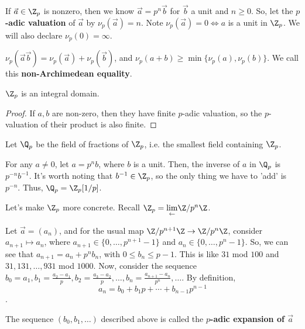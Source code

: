 \begin{defn}
    If $\vec a \in \Z_p$ is nonzero, then we know $\vec a = p^n\vec b$ for $\vec b$ a unit and $n \geq 0$. So, let the \textbf{$p$-adic valuation} of $\vec a$ by $\nu_p(\vec a)=n$. Note $\nu_p(\vec a) = 0 \iff a$ is a unit in $\Z_p$. We will also declare $\nu_p(0) = \infty$.
\end{defn}

\begin{rmk}
    $\nu_p(\vec a \vec b)=\nu_p(\vec a)+\nu _p(\vec b)$, and $\nu_p(a+b) \geq \min \{\nu _p(a),\nu _p(b)\}$. We call this \textbf{non-Archimedean equality}.
\end{rmk}

\begin{cor}
    $\Z_p$ is an integral domain.
\end{cor}

\begin{proof}
    If $a,b$ are non-zero, then they have finite $p$-adic valuation, so the $p$-valuation of their product is also finite.
\end{proof}

\begin{defn}[$\Q_p$]
    Let $\Q_p$ be the field of fractions of $\Z_p$, i.e. the smallest field containing $\Z_p$.
\end{defn}

\begin{rmk}
    For any $a \neq 0$, let $a=p^nb$, where $b$ is a unit. Then, the inverse of $a$ in $\Q_p$ is $p^{-n}b^{-1}$. It's worth noting that $b^{-1} \in \Z_p$, so the only thing we have to 'add' is $p^{-n}$. Thus, $\Q_p = \Z_p[1/p]$.
\end{rmk}

Let's make $\Z_p$ more concrete. Recall $\Z_p = \underset{\leftarrow}{\lim}\Z/p^n\Z$.

Let $\vec a = (a_n)$, and for the usual map $\Z/{p^{n+1}}\Z \to \Z/p^n\Z$, consider $a_{n+1}\mapsto a_n$, where $a_{n+1}\in \{0,\dots,p^{n+1}-1\}$ and $a_n \in \{0,\dots,p^n-1\}$. So, we can see that $a_{n+1}=a_n+p^nb_n$, with $0 \leq b_n \leq p-1$. This is like $31$ mod $100$ and $31,131,\dots,931$ mod $1000$. Now, consider the sequence $b_0=a_1,b_1=\frac{a_2-a_1}{p},b_2=\frac{a_3-a_2}{p},\dots,b_n=\frac{a_{n+1}-a_n}{p^n},\dots$. By definition,
$$a_n=b_0+b_1p+\cdots+b_{n-1}p^{n-1}$$.

\begin{defn}
    The sequence $(b_0,b_1,\dots)$ described above is called the \textbf{$p$-adic expansion of $\vec a$}
\end{defn}

